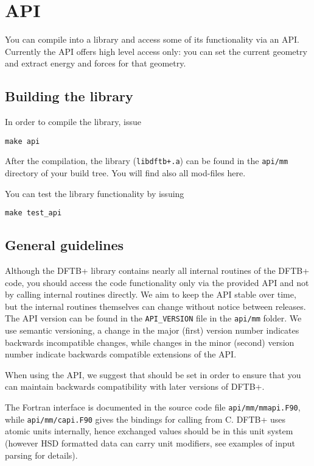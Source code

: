\chapter{\dftbp{} API}

You can compile \dftbp{} into a library and access some of its functionality via
an API. Currently the API offers high level access only: you can set the current
geometry and extract energy and forces for that geometry.

\section{Building the library}

In order to compile the \dftbp{} library, issue
\begin{verbatim}
make api
\end{verbatim}
After the compilation, the library (\verb|libdftb+.a|) can be found in the
\verb|api/mm| directory of your build tree. You will find also all mod-files
here.

You can test the library functionality by issuing
\begin{verbatim}
make test_api
\end{verbatim}


\section{General guidelines}

Although the DFTB+ library contains nearly all internal routines of the DFTB+
code, you should access the code functionality only via the provided API and not
by calling internal routines directly. We aim to keep the API stable over time,
but the internal routines themselves can change without notice between
releases. The API version can be found in the \verb|API_VERSION| file in the
\verb|api/mm| folder. We use semantic versioning, a change in the major (first)
version number indicates backwards incompatible changes, while changes in the
minor (second) version number indicate backwards compatible extensions of the
API.

When using the API, we suggest that  should be set in order to
ensure that you can maintain backwards compatibility with later versions of
DFTB+.

The Fortran interface is documented in the source code file
\verb|api/mm/mmapi.F90|, while \verb|api/mm/capi.F90| gives the bindings for
calling from C. DFTB+ uses atomic units internally, hence exchanged values
should be in this unit system (however HSD formatted data can carry unit
modifiers, see examples of input parsing for details).
